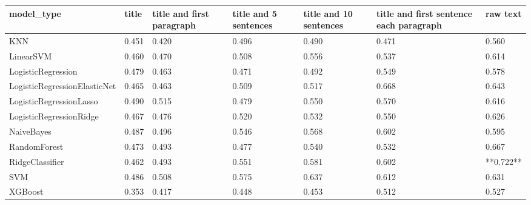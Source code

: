 \begin{tabular}{lllllll}
\toprule
                  model\_type & title & title and first paragraph & title and 5 sentences & title and 10 sentences & title and first sentence each paragraph &  raw text \\
\midrule
                         KNN & 0.451 &                     0.420 &                 0.496 &                  0.490 &                                   0.471 &     0.560 \\
                   LinearSVM & 0.460 &                     0.470 &                 0.508 &                  0.556 &                                   0.537 &     0.614 \\
          LogisticRegression & 0.479 &                     0.463 &                 0.471 &                  0.492 &                                   0.549 &     0.578 \\
LogisticRegressionElasticNet & 0.465 &                     0.463 &                 0.509 &                  0.517 &                                   0.668 &     0.643 \\
     LogisticRegressionLasso & 0.490 &                     0.515 &                 0.479 &                  0.550 &                                   0.570 &     0.616 \\
     LogisticRegressionRidge & 0.467 &                     0.476 &                 0.520 &                  0.532 &                                   0.550 &     0.626 \\
                  NaiveBayes & 0.487 &                     0.496 &                 0.546 &                  0.568 &                                   0.602 &     0.595 \\
                RandomForest & 0.473 &                     0.493 &                 0.477 &                  0.540 &                                   0.532 &     0.667 \\
             RidgeClassifier & 0.462 &                     0.493 &                 0.551 &                  0.581 &                                   0.602 & **0.722** \\
                         SVM & 0.486 &                     0.508 &                 0.575 &                  0.637 &                                   0.612 &     0.631 \\
                     XGBoost & 0.353 &                     0.417 &                 0.448 &                  0.453 &                                   0.512 &     0.527 \\
\bottomrule
\end{tabular}

